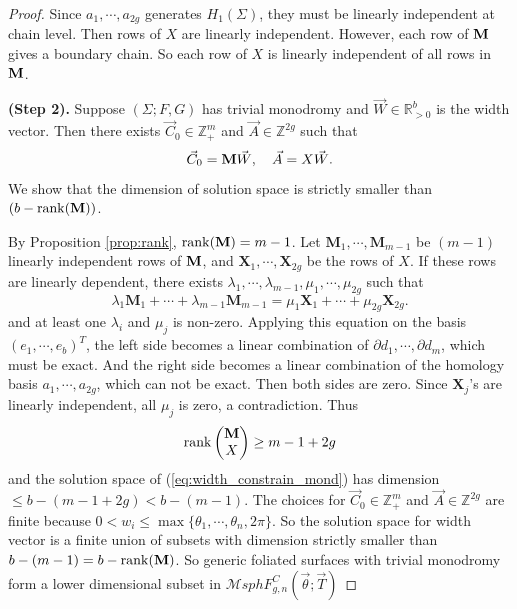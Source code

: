 \documentclass[pdflatex,sn-mathphys]{sn-jnl}%
\numberwithin{equation}{section}
\theoremstyle{thmstyleone}%
\newcommand{\RR}{\mathbb{R}}
\newcommand{\ZZ}{\mathbb{Z}}
\newcommand{\pt}{\partial}
\newcommand{\MsphgnCFT}{\mathcal{M}sphF_{g,n}^C(\vec{\theta};\vec{T})}
\begin{document}
\begin{proof}
    Since $a_1,\cdots,a_{2g}$ generates $H_1(\Sigma)$, they must be linearly independent at chain level. Then rows of $X$ are linearly independent. However, each row of $\mathbf{M}$ gives a boundary chain. So each row of $X$ is linearly independent of all rows in $\mathbf{M}$.

    \medskip
    \textbf{(Step 2).} Suppose $(\Sigma;F,G)$ has trivial monodromy and $\vec{W}\in\RR_{>0}^b$ is the width vector. Then there exists $\vec{C}_0\in\ZZ_+^m$ and $\vec{A}\in\ZZ^{2g}$ such that
    \begin{equation}\label{eq:width_constrain_mond}
        \vec{C}_0=\mathbf{M} \vec{W},\quad \vec{A}=X \vec{W}.
    \end{equation}
    We show that %
    the dimension of solution space is strictly smaller than $(b-\mathrm{rank}(\mathbf{M}))$. %
    
    By Proposition \ref{prop:rank}, $\mathrm{rank}(\mathbf{M}) = m-1$. Let $\boldsymbol{M}_1,\cdots,\boldsymbol{M}_{m-1}$ be $(m-1)$ linearly independent rows of $\mathbf{M}$, and $\boldsymbol{X}_1,\cdots,\boldsymbol{X}_{2g}$ be the rows of $X$.
    If these rows are linearly dependent, there exists $\lambda_1,\cdots,\lambda_{m-1},\mu_1,\cdots,\mu_{2g}$ such that
    $$ \lambda_1 \boldsymbol{M}_1 + \cdots + \lambda_{m-1} \boldsymbol{M}_{m-1} = \mu_1 \boldsymbol{X}_1 + \cdots + \mu_{2g} \boldsymbol{X}_{2g}. $$
    and at least one $\lambda_i$ and $\mu_j$ is non-zero.
    Applying this equation on the basis $\left( e_1, \cdots, e_b \right)^T$, the left side becomes a linear combination of $\pt d_1,\cdots,\pt d_m$, which must be exact. And the right side becomes a linear combination of the homology basis $a_1,\cdots,a_{2g}$, which can not be exact. Then both sides are zero. Since $\boldsymbol{X}_j$'s are linearly independent, all $\mu_j$ is zero, a contradiction.
    Thus
    $$\mathrm{rank}\begin{pmatrix} \mathbf{M} \\ X \end{pmatrix} \geq m-1+2g$$
    and the solution space of (\ref{eq:width_constrain_mond}) has dimension $\leq b-(m-1+2g) < b-(m-1)$.
    The choices for $\vec{C}_0\in\ZZ_+^m$ and $\vec{A}\in\ZZ^{2g}$ are finite because $0<w_i\leq\max\{\theta_1,\cdots,\theta_n, 2\pi\}$. So the solution space for width vector is a finite union of subsets with dimension strictly smaller than $b-(m-1)= b-\mathrm{rank}(\mathbf{M})$. 
    So generic foliated surfaces with trivial monodromy form a lower dimensional subset in $\MsphgnCFT$


\end{proof}
\end{document}
